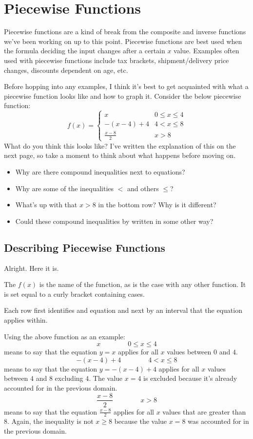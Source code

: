 \clearpage\chapter{Piecewise Functions}
Piecewise functions are a kind of break from the composite and inverse functions we've been working on up to this point. Piecewise functions are best used when the formula deciding the input changes after a certain $x$ value. Examples often used with piecewise functions include tax brackets, shipment/delivery price changes, discounts dependent on age, etc.

Before hopping into any examples, I think it's best to get acquainted with what a piecewise function looks like and how to graph it. Consider the below piecewise function:
\[
f(x) = 
\begin{cases}
    x & 0 \le x \le 4 \\
    -(x - 4) + 4 & 4 < x \le 8 \\
    \frac{x - 8}{2} & x > 8
\end{cases}
\]
What do you think this looks like? I've written the explanation of this on the next page, so take a moment to think about what happens before moving on.
\begin{itemize}
    \item Why are there compound inequalities next to equations?
    \item Why are some of the inequalities $<$ and others $\le$?
    \item What's up with that $x > 8$ in the bottom row? Why is it different?
    \item Could these compound inequalities by written in some other way?
\end{itemize}
\clearpage
\section{Describing Piecewise Functions}
Alright. Here it is.

The $f(x)$ is the name of the function, as is the case with any other function. It is set equal to a curly bracket containing cases.

Each row first identifies and equation and next by an interval that the equation applies within.

Using the above function as an example:
\[
x \qquad \qquad 0 \le x \le 4
\]
means to say that the equation $y = x$ applies for all $x$ values between $0$ and $4$.
\[
-(x - 4) + 4 \qquad \qquad 4 < x \le 8
\]
means to say that the equation $y = -(x - 4) + 4$ applies for all $x$ values between $4$ and $8$ excluding $4$. The value $x = 4$ is excluded because it's already accounted for in the previous domain.
\[
\frac{x - 8}{2} \qquad \qquad x > 8
\]
means to say that the equation $\frac{x - 8}{2}$ applies for all $x$ values that are greater than $8$. Again, the inequality is not $x \ge 8$ because the value $x = 8$ was accounted for in the previous domain.

